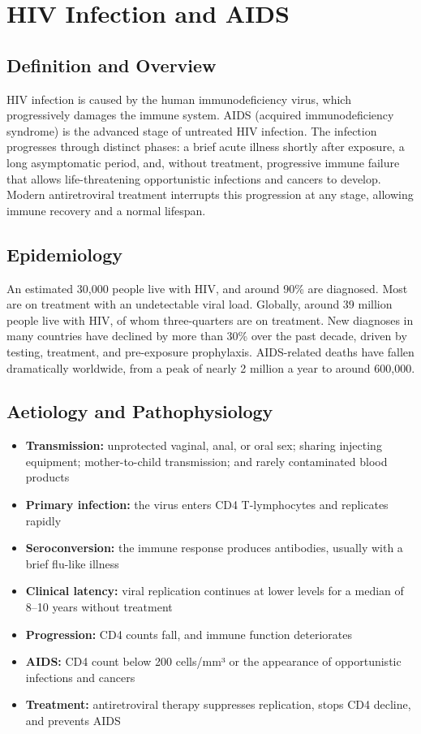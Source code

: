 \chapter{HIV Infection and AIDS}

\section*{Definition and Overview}
HIV infection is caused by the human immunodeficiency virus, which progressively damages the immune system. AIDS (acquired immunodeficiency syndrome) is the advanced stage of untreated HIV infection. The infection progresses through distinct phases: a brief acute illness shortly after exposure, a long asymptomatic period, and, without treatment, progressive immune failure that allows life-threatening opportunistic infections and cancers to develop. Modern antiretroviral treatment interrupts this progression at any stage, allowing immune recovery and a normal lifespan.

\section*{Epidemiology}
An estimated 30,000 people live with HIV, and around 90\% are diagnosed. Most are on treatment with an undetectable viral load. Globally, around 39 million people live with HIV, of whom three-quarters are on treatment. New diagnoses in many countries have declined by more than 30\% over the past decade, driven by testing, treatment, and pre-exposure prophylaxis. AIDS-related deaths have fallen dramatically worldwide, from a peak of nearly 2 million a year to around 600,000.

\section*{Aetiology and Pathophysiology}
\begin{itemize}
    \item \textbf{Transmission:} unprotected vaginal, anal, or oral sex; sharing injecting equipment; mother-to-child transmission; and rarely contaminated blood products
    \item \textbf{Primary infection:} the virus enters CD4 T-lymphocytes and replicates rapidly
    \item \textbf{Seroconversion:} the immune response produces antibodies, usually with a brief flu-like illness
    \item \textbf{Clinical latency:} viral replication continues at lower levels for a median of 8--10 years without treatment
    \item \textbf{Progression:} CD4 counts fall, and immune function deteriorates
    \item \textbf{AIDS:} CD4 count below 200 cells/mm³ or the appearance of opportunistic infections and cancers
    \item \textbf{Treatment:} antiretroviral therapy suppresses replication, stops CD4 decline, and prevents AIDS
\end{itemize}

